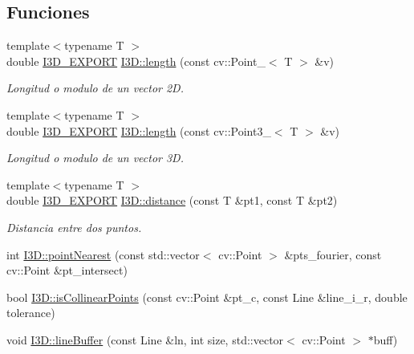 \subsection*{Funciones}
\begin{DoxyCompactItemize}
\item 
{\footnotesize template$<$typename T $>$ }\\double \hyperlink{defs_8h_a83f373279ee1ca96b4003c673142ec1d}{I3\+D\+\_\+\+E\+X\+P\+O\+RT} \hyperlink{group___geometric_entities_ga6cfd96fd34bd41f5b201d69d70daa705}{I3\+D\+::length} (const cv\+::\+Point\+\_\+$<$ T $>$ \&v)
\begin{DoxyCompactList}\small\item\em Longitud o modulo de un vector 2D. \end{DoxyCompactList}\item 
{\footnotesize template$<$typename T $>$ }\\double \hyperlink{defs_8h_a83f373279ee1ca96b4003c673142ec1d}{I3\+D\+\_\+\+E\+X\+P\+O\+RT} \hyperlink{group___geometric_entities_gadc4e42bc957a28f97e0d45d09d5e1db7}{I3\+D\+::length} (const cv\+::\+Point3\+\_\+$<$ T $>$ \&v)
\begin{DoxyCompactList}\small\item\em Longitud o modulo de un vector 3D. \end{DoxyCompactList}\item 
{\footnotesize template$<$typename T $>$ }\\double \hyperlink{defs_8h_a83f373279ee1ca96b4003c673142ec1d}{I3\+D\+\_\+\+E\+X\+P\+O\+RT} \hyperlink{group___geometric_entities_gaf3a6913bb5125e5d2e69a2e48c7336fd}{I3\+D\+::distance} (const T \&pt1, const T \&pt2)
\begin{DoxyCompactList}\small\item\em Distancia entre dos puntos. \end{DoxyCompactList}\item 
int \hyperlink{group___geometric_entities_ga50289ee8c51aeff4b2f4706acbabd932}{I3\+D\+::point\+Nearest} (const std\+::vector$<$ cv\+::\+Point $>$ \&pts\+\_\+fourier, const cv\+::\+Point \&pt\+\_\+intersect)
\item 
bool \hyperlink{group___geometric_entities_gaa7aa32d175a13ad9ac23bfe016754b1f}{I3\+D\+::is\+Collinear\+Points} (const cv\+::\+Point \&pt\+\_\+c, const Line \&line\+\_\+i\+\_\+r, double tolerance)
\item 
void \hyperlink{group___geometric_entities_gaa2e0864c0027dbf1cf826970a30d47a0}{I3\+D\+::line\+Buffer} (const Line \&ln, int size, std\+::vector$<$ cv\+::\+Point $>$ $\ast$buff)

\end{DoxyCompactItemize}
